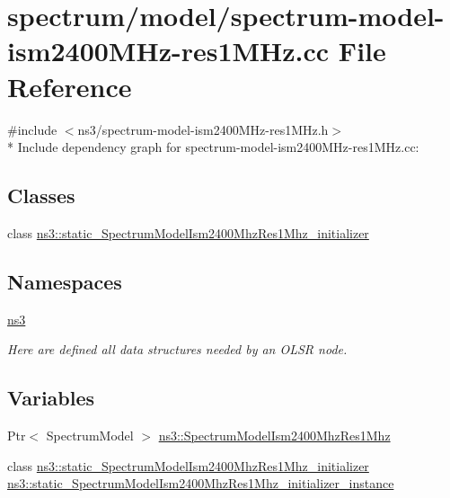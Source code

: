 \hypertarget{spectrum-model-ism2400MHz-res1MHz_8cc}{}\section{spectrum/model/spectrum-\/model-\/ism2400\+M\+Hz-\/res1\+M\+Hz.cc File Reference}
\label{spectrum-model-ism2400MHz-res1MHz_8cc}
{\ttfamily \#include $<$ns3/spectrum-\/model-\/ism2400\+M\+Hz-\/res1\+M\+Hz.\+h$>$}\\*
Include dependency graph for spectrum-\/model-\/ism2400\+M\+Hz-\/res1\+M\+Hz.cc\+:
\subsection*{Classes}
\begin{DoxyCompactItemize}
\item 
class \hyperlink{classns3_1_1static__SpectrumModelIsm2400MhzRes1Mhz__initializer}{ns3\+::static\+\_\+\+Spectrum\+Model\+Ism2400\+Mhz\+Res1\+Mhz\+\_\+initializer}
\end{DoxyCompactItemize}
\subsection*{Namespaces}
\begin{DoxyCompactItemize}
\item 
 \hyperlink{namespacens3}{ns3}
\begin{DoxyCompactList}\small\item\em Here are defined all data structures needed by an O\+L\+SR node. \end{DoxyCompactList}\end{DoxyCompactItemize}
\subsection*{Variables}
\begin{DoxyCompactItemize}
\item 
Ptr$<$ Spectrum\+Model $>$ \hyperlink{namespacens3_abc4832a3e0215c64830c831ea89da6c4}{ns3\+::\+Spectrum\+Model\+Ism2400\+Mhz\+Res1\+Mhz}
\item 
class \hyperlink{classns3_1_1static__SpectrumModelIsm2400MhzRes1Mhz__initializer}{ns3\+::static\+\_\+\+Spectrum\+Model\+Ism2400\+Mhz\+Res1\+Mhz\+\_\+initializer} \hyperlink{namespacens3_a888401b7181bccd7dc6be964d67c9cb0}{ns3\+::static\+\_\+\+Spectrum\+Model\+Ism2400\+Mhz\+Res1\+Mhz\+\_\+initializer\+\_\+instance}
\end{DoxyCompactItemize}
